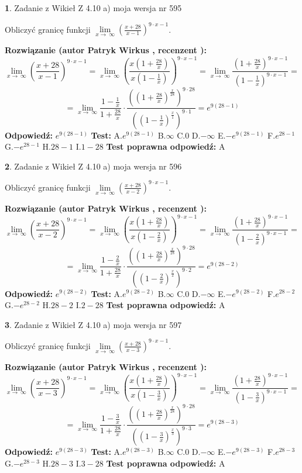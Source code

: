 \documentclass[12pt, a4paper]{article}
\theoremstyle{definition} %
\newtheorem{zad}{}
\newcommand{\zadStart}[1]{\begin{zad}#1\newline}
\newcommand{\zadStop}{\end{zad}}
\newcommand{\rozwStart}[2]{\noindent \textbf{Rozwiązanie (autor #1 , recenzent #2): }\newline}
\newcommand{\rozwStop}{\newline}
\newcommand{\odpStart}{\noindent \textbf{Odpowiedź:}\newline}
\newcommand{\odpStop}{\newline}
\newcommand{\testStart}{\noindent \textbf{Test:}\newline}
\newcommand{\testStop}{\newline}
\newcommand{\kluczStart}{\noindent \textbf{Test poprawna odpowiedź:}\newline}
\newcommand{\kluczStop}{\newline}
\begin{document}
\zadStart{Zadanie z Wikieł Z 4.10 a) moja wersja nr 595}


Obliczyć granicę funkcji  $\lim\limits_{x\to\ \infty}(\frac{x+28}{x-1})^{9\cdot x-1}$.
\zadStop
\rozwStart{Patryk Wirkus}{}
$$\lim\limits_{x\to\ \infty}(\frac{x+28}{x-1})^{9\cdot x-1} = \lim\limits_{x\to\ \infty}(\frac{x(1+\frac{28}{x})}{x(1-\frac{1}{x})})^{9\cdot x-1}=\lim\limits_{x\to\ \infty}\frac{(1+\frac{28}{x})^{9\cdot x-1}}{(1-\frac{1}{x})^{9\cdot x-1}}=$$
$$=\lim\limits_{x\to\ \infty}\frac{1-\frac{1}{x}}{1+\frac{28}{x}}\cdot\frac{((1+\frac{28}{x})^{\frac{x}{28}})^{9\cdot28}}{((1-\frac{1}{x})^{\frac{x}{1}})^{9\cdot1}}=e^{9(28-1)}$$
\rozwStop
\odpStart
$e^{9(28-1)}$
\odpStop
\testStart
A.$e^{9(28-1)}$ B.$\infty$ C.$0$ D.$-\infty$ E.$-e^{9(28-1)}$
F.$e^{28-1}$ G.$-e^{28-1}$
H.$28-1$
I.$1-28$
\testStop
\kluczStart
A
\kluczStop



\zadStart{Zadanie z Wikieł Z 4.10 a) moja wersja nr 596}


Obliczyć granicę funkcji  $\lim\limits_{x\to\ \infty}(\frac{x+28}{x-2})^{9\cdot x-1}$.
\zadStop
\rozwStart{Patryk Wirkus}{}
$$\lim\limits_{x\to\ \infty}(\frac{x+28}{x-2})^{9\cdot x-1} = \lim\limits_{x\to\ \infty}(\frac{x(1+\frac{28}{x})}{x(1-\frac{2}{x})})^{9\cdot x-1}=\lim\limits_{x\to\ \infty}\frac{(1+\frac{28}{x})^{9\cdot x-1}}{(1-\frac{2}{x})^{9\cdot x-1}}=$$
$$=\lim\limits_{x\to\ \infty}\frac{1-\frac{2}{x}}{1+\frac{28}{x}}\cdot\frac{((1+\frac{28}{x})^{\frac{x}{28}})^{9\cdot28}}{((1-\frac{2}{x})^{\frac{x}{2}})^{9\cdot2}}=e^{9(28-2)}$$
\rozwStop
\odpStart
$e^{9(28-2)}$
\odpStop
\testStart
A.$e^{9(28-2)}$ B.$\infty$ C.$0$ D.$-\infty$ E.$-e^{9(28-2)}$
F.$e^{28-2}$ G.$-e^{28-2}$
H.$28-2$
I.$2-28$
\testStop
\kluczStart
A
\kluczStop



\zadStart{Zadanie z Wikieł Z 4.10 a) moja wersja nr 597}


Obliczyć granicę funkcji  $\lim\limits_{x\to\ \infty}(\frac{x+28}{x-3})^{9\cdot x-1}$.
\zadStop
\rozwStart{Patryk Wirkus}{}
$$\lim\limits_{x\to\ \infty}(\frac{x+28}{x-3})^{9\cdot x-1} = \lim\limits_{x\to\ \infty}(\frac{x(1+\frac{28}{x})}{x(1-\frac{3}{x})})^{9\cdot x-1}=\lim\limits_{x\to\ \infty}\frac{(1+\frac{28}{x})^{9\cdot x-1}}{(1-\frac{3}{x})^{9\cdot x-1}}=$$
$$=\lim\limits_{x\to\ \infty}\frac{1-\frac{3}{x}}{1+\frac{28}{x}}\cdot\frac{((1+\frac{28}{x})^{\frac{x}{28}})^{9\cdot28}}{((1-\frac{3}{x})^{\frac{x}{3}})^{9\cdot3}}=e^{9(28-3)}$$
\rozwStop
\odpStart
$e^{9(28-3)}$
\odpStop
\testStart
A.$e^{9(28-3)}$ B.$\infty$ C.$0$ D.$-\infty$ E.$-e^{9(28-3)}$
F.$e^{28-3}$ G.$-e^{28-3}$
H.$28-3$
I.$3-28$
\testStop
\kluczStart
A
\kluczStop
\end{document}
